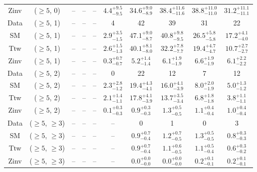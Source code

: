 \begin{table}[h!]
{\begin{tabular}{cccccccccc}
	Zinv & ($\ge5$, 0) & -- & -- & -- & $4.4^{+ 9.5 }_{- 9.5 }$ & $34.6^{+ 9.0 }_{- 8.9 }$ & $38.4^{+ 11.6 }_{- 11.6 }$ & $38.8^{+ 11.0 }_{- 11.0 }$ & $31.2^{+ 11.1 }_{- 11.1 }$ \\[0.5ex] 
	Data & ($\ge5$, 1) & -- & -- & -- & 4 & 42 & 39 & 31 & 22 \\[0.5ex] 
	SM & ($\ge5$, 1) & -- & -- & -- & $2.9^{+ 3.5 }_{- 1.5 }$ & $47.1^{+ 9.0 }_{- 8.7 }$ & $40.8^{+ 9.8 }_{- 9.5 }$ & $26.5^{+ 5.8 }_{- 5.8 }$ & $17.2^{+ 4.1 }_{- 4.0 }$ \\[0.5ex] 
	Ttw & ($\ge5$, 1) & -- & -- & -- & $2.6^{+ 1.5 }_{- 1.3 }$ & $40.1^{+ 8.1 }_{- 8.0 }$ & $32.2^{+ 7.8 }_{- 7.7 }$ & $19.4^{+ 4.7 }_{- 4.7 }$ & $10.7^{+ 2.7 }_{- 2.7 }$ \\[0.5ex] 
	Zinv & ($\ge5$, 1) & -- & -- & -- & $0.3^{+ 0.7 }_{- 0.7 }$ & $5.2^{+ 1.4 }_{- 1.4 }$ & $6.1^{+ 1.9 }_{- 1.9 }$ & $6.6^{+ 1.9 }_{- 1.9 }$ & $6.1^{+ 2.2 }_{- 2.2 }$ \\[0.5ex] 
	Data & ($\ge5$, 2) & -- & -- & -- & 0 & 22 & 12 & 7 & 12 \\[0.5ex] 
	SM & ($\ge5$, 2) & -- & -- & -- & $2.3^{+ 2.8 }_{- 1.2 }$ & $19.4^{+ 4.3 }_{- 4.1 }$ & $16.0^{+ 4.1 }_{- 3.9 }$ & $8.0^{+ 2.0 }_{- 1.9 }$ & $5.0^{+ 1.3 }_{- 1.2 }$ \\[0.5ex] 
	Ttw & ($\ge5$, 2) & -- & -- & -- & $2.1^{+ 1.4 }_{- 1.1 }$ & $17.8^{+ 4.1 }_{- 3.9 }$ & $13.7^{+ 3.5 }_{- 3.4 }$ & $6.8^{+ 1.8 }_{- 1.8 }$ & $3.8^{+ 1.1 }_{- 1.1 }$ \\[0.5ex] 
	Zinv & ($\ge5$, 2) & -- & -- & -- & $0.1^{+ 0.3 }_{- 0.3 }$ & $0.9^{+ 0.3 }_{- 0.3 }$ & $1.3^{+ 0.5 }_{- 0.5 }$ & $1.1^{+ 0.4 }_{- 0.4 }$ & $1.0^{+ 0.4 }_{- 0.4 }$ \\[0.5ex] 
	Data & ($\ge5$, $\ge3$) & -- & -- & -- & -- & 0 & 1 & 0 & 3 \\[0.5ex] 
	SM & ($\ge5$, $\ge3$) & -- & -- & -- & -- & $0.9^{+ 0.7 }_{- 0.4 }$ & $1.2^{+ 0.7 }_{- 0.5 }$ & $1.3^{+ 0.5 }_{- 0.5 }$ & $0.8^{+ 0.3 }_{- 0.3 }$ \\[0.5ex] 
	Ttw & ($\ge5$, $\ge3$) & -- & -- & -- & -- & $0.9^{+ 0.7 }_{- 0.4 }$ & $1.1^{+ 0.6 }_{- 0.5 }$ & $1.1^{+ 0.5 }_{- 0.4 }$ & $0.6^{+ 0.3 }_{- 0.2 }$ \\[0.5ex] 
	Zinv & ($\ge5$, $\ge3$) & -- & -- & -- & -- & $0.0^{+ 0.0 }_{- 0.0 }$ & $0.0^{+ 0.0 }_{- 0.0 }$ & $0.2^{+ 0.1 }_{- 0.1 }$ & $0.2^{+ 0.1 }_{- 0.1 }$ \\[0.5ex] 
	\hline
	\hline
\end{tabular}}
\end{table}
